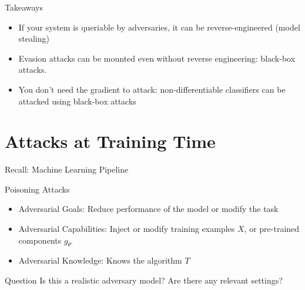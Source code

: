 \documentclass[10pt]{beamer}
\begin{document}
\begin{frame}{Takeaways}

  \begin{itemize}[<+->]
    \item If your system is queriable by adversaries, it can be reverse-engineered (model stealing)
    \item Evasion attacks can be mounted even without reverse engineering: black-box attacks.
    \item
      You don't need the gradient to attack: non-differentiable classifiers can be attacked using
      black-box attacks
  \end{itemize}

\end{frame}


\section{Attacks at Training Time}


\begin{frame}[fragile]{Recall: Machine Learning Pipeline}
  
\end{frame}


\begin{frame}[fragile]{Poisoning Attacks}
  \centering
  

  \begin{itemize}[<+-| alert@+>]
    \item Adversarial Goals: Reduce performance of the model or modify the task
    \item Adversarial Capabilities: Inject or modify training examples $X$, or pre-trained components
      $g_{\theta'}$
    \item Adversarial Knowledge: Knows the algorithm $T$
  \end{itemize}

  \begin{alertblock}{Question}
    Is this a realistic adversary model? Are there any relevant settings?
  \end{alertblock}
\end{frame}
\end{document}
